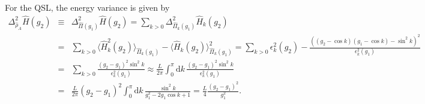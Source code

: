 \documentclass[prl,aps,amssymb,twocolumn,superscriptaddress, notitlepage, longbibliography]{revtex4-2}
\begin{document}
For the QSL, the energy variance is given by
\begin{eqnarray}
    \Delta^2_{\hat\rho_A}\hat H(g_2)&\equiv&\Delta^2_{\hat\Pi(g_1)}\hat H(g_2)=\sum_{k>0}\Delta^2_{\hat\Pi_k(g_1)}\hat H_k(g_2)\\
    &=&\sum_{k>0}\langle\hat H^2_k(g_2)\rangle_{\hat\Pi_k(g_1)}-\langle\hat H_k(g_2)\rangle^2_{\hat\Pi_k(g_1)}=\sum_{k>0}\epsilon^2_k(g_2)-\frac{((g_2-\cos k)(g_1-\cos k)-\sin^2k)^2}{\epsilon^2_k(g_1)}\nonumber\\
    &=&\sum_{k>0}\frac{(g_2-g_1)^2\sin^2 k}{\epsilon^2_k(g_1)}\approx\frac{L}{2\pi}\int_0^\pi\mathrm dk\,\frac{(g_2-g_1)^2\sin^2 k}{\epsilon^2_k(g_1)}\nonumber\\
    &=&\frac{L}{2\pi}(g_2-g_1)^2\int_0^\pi\mathrm dk\,\frac{\sin^2 k}{g^2_1-2g_1\cos k+1}=\frac{L}{4}\frac{(g_2-g_1)^2}{g^2_1}.\nonumber
\end{eqnarray}
\end{document}
